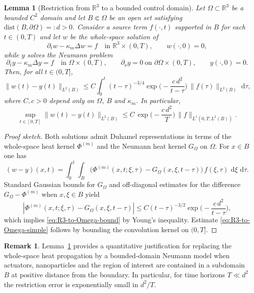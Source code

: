 \documentclass[11pt,a4paper]{article}
\numberwithin{equation}{section}
\newtheorem{lemma}[theorem]{Lemma}
\theoremstyle{definition}
\newtheorem{remark}[theorem]{Remark}
\newcommand{\R}{\mathbb{R}}
\newcommand{\1}{\mathbbm{1}}
\newcommand{\dd}{\,\mathrm{d}}
\newcommand{\kappam}{\kappa_m}
\begin{document}
\begin{lemma}[Restriction from $\R^3$ to a bounded control domain]
\label{lem:R3-to-Omega-restriction}
Let $\Omega\subset\R^3$ be a bounded $C^2$ domain and let $B\Subset\Omega$ be an
open set satisfying $\mathrm{dist}(B,\partial\Omega)=:d>0$. Consider a source
term $f(\cdot,t)$ supported in $B$ for each $t\in(0,T)$ and let $w$ be the
whole-space solution of
\[
\partial_t w-\kappam\Delta w=f\quad\text{in }\R^3\times(0,T),\qquad w(\cdot,0)=0,
\]
while $y$ solves the Neumann problem
\[
\partial_t y-\kappam\Delta y=f\quad\text{in }\Omega\times(0,T),\qquad
\partial_\nu y=0\ \text{on }\partial\Omega\times(0,T),\qquad y(\cdot,0)=0.
\]
Then, for all $t\in(0,T]$,
\begin{equation}
\label{eq:R3-to-Omega-bound}
\|w(t)-y(t)\|_{L^2(B)}
\le C\int_0^t (t-\tau)^{-3/4}\exp\!\Big(-\frac{c\,d^2}{t-\tau}\Big)\,
\|f(\tau)\|_{L^2(B)}\,\dd\tau,
\end{equation}
where $C,c>0$ depend only on $\Omega$, $B$ and $\kappam$. In particular,
\begin{equation}
\label{eq:R3-to-Omega-simple}
\sup_{t\in[0,T]}\|w(t)-y(t)\|_{L^2(B)}
\le C\,\exp\!\Big(-\frac{c\,d^2}{T}\Big)\,\|f\|_{L^1(0,T;L^2(B))}.
\end{equation}
\end{lemma}

\begin{proof}[Proof sketch]
Both solutions admit Duhamel representations in terms of the whole-space heat
kernel $\Phi^{(m)}$ and the Neumann heat kernel $G_\Omega$ on $\Omega$.
For $x\in B$ one has
\[
(w-y)(x,t)=\int_0^t\!\int_{B}\big(\Phi^{(m)}(x,t;\xi,\tau)-G_\Omega(x,\xi,t-\tau)\big)\,
f(\xi,\tau)\,\dd\xi\,\dd\tau.
\]
Standard Gaussian bounds for $G_\Omega$ and off-diagonal estimates for the
difference $G_\Omega-\Phi^{(m)}$ when $x,\xi\in B$ yield
\[
|\Phi^{(m)}(x,t;\xi,\tau)-G_\Omega(x,\xi,t-\tau)|
\le C(t-\tau)^{-3/2}\exp\!\Big(-\frac{c\,d^2}{t-\tau}\Big),
\]
which implies \eqref{eq:R3-to-Omega-bound} by Young's inequality. Estimate
\eqref{eq:R3-to-Omega-simple} follows by bounding the convolution kernel on
$(0,T]$.
\end{proof}



\begin{remark}
Lemma~\ref{lem:R3-to-Omega-restriction} provides a quantitative justification
for replacing the whole-space heat propagation by a bounded-domain Neumann
model when actuators, nanoparticles and the region of interest are contained
in a subdomain $B$ at positive distance from the boundary. In particular, for
time horizons $T\ll d^2$ the restriction error is exponentially small in
$d^2/T$.
\end{remark}
\end{document}
